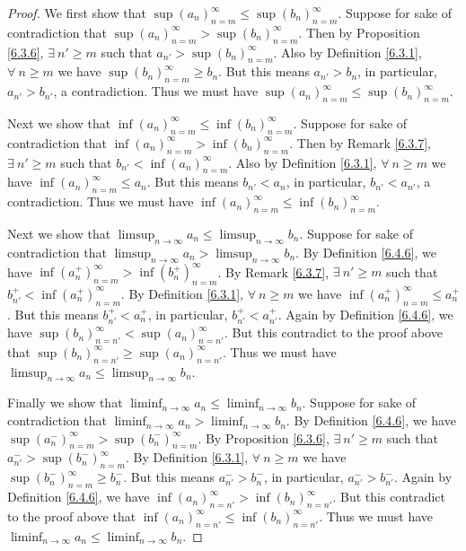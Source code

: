 \begin{proof}
    We first show that \(\sup(a_n)_{n = m}^\infty \leq \sup(b_n)_{n = m}^\infty\).
    Suppose for sake of contradiction that \(\sup(a_n)_{n = m}^\infty > \sup(b_n)_{n = m}^\infty\).
    Then by Proposition \ref{6.3.6}, \(\exists\ n' \geq m\) such that \(a_{n'} > \sup(b_n)_{n = m}^\infty\).
    Also by Definition \ref{6.3.1}, \(\forall\ n \geq m\) we have \(\sup(b_n)_{n = m}^\infty \geq b_n\).
    But this means \(a_{n'} > b_n\), in particular, \(a_{n'} > b_{n'}\), a contradiction.
    Thus we must have \(\sup(a_n)_{n = m}^\infty \leq \sup(b_n)_{n = m}^\infty\).

    Next we show that \(\inf(a_n)_{n = m}^\infty \leq \inf(b_n)_{n = m}^\infty\).
    Suppose for sake of contradiction that \(\inf(a_n)_{n = m}^\infty > \inf(b_n)_{n = m}^\infty\).
    Then by Remark \ref{6.3.7}, \(\exists\ n' \geq m\) such that \(b_{n'} < \inf(a_n)_{n = m}^\infty\).
    Also by Definition \ref{6.3.1}, \(\forall\ n \geq m\) we have \(\inf(a_n)_{n = m}^\infty \leq a_n\).
    But this means \(b_{n'} < a_n\), in particular, \(b_{n'} < a_{n'}\), a contradiction.
    Thus we must have \(\inf(a_n)_{n = m}^\infty \leq \inf(b_n)_{n = m}^\infty\).

    Next we show that \(\limsup_{n \to \infty} a_n \leq \limsup_{n \to \infty} b_n\).
    Suppose for sake of contradiction that \(\limsup_{n \to \infty} a_n > \limsup_{n \to \infty} b_n\).
    By Definition \ref{6.4.6}, we have \(\inf(a_n^+)_{n = m}^\infty > \inf(b_n^+)_{n = m}^\infty\).
    By Remark \ref{6.3.7}, \(\exists\ n' \geq m\) such that \(b_{n'}^+ < \inf(a_n^+)_{n = m}^\infty\).
    By Definition \ref{6.3.1}, \(\forall\ n \geq m\) we have \(\inf(a_n^+)_{n = m}^\infty \leq a_n^+\).
    But this means \(b_{n'}^+ < a_n^+\), in particular, \(b_{n'}^+ < a_{n'}^+\).
    Again by Definition \ref{6.4.6}, we have \(\sup(b_n)_{n = n'}^\infty < \sup(a_n)_{n = n'}^\infty\).
    But this contradict to the proof above that \(\sup(b_n)_{n = n'}^\infty \geq \sup(a_n)_{n = n'}^\infty\).
    Thus we must have \(\limsup_{n \to \infty} a_n \leq \limsup_{n \to \infty} b_n\).

    Finally we show that \(\liminf_{n \to \infty} a_n \leq \liminf_{n \to \infty} b_n\).
    Suppose for sake of contradiction that \(\liminf_{n \to \infty} a_n > \liminf_{n \to \infty} b_n\).
    By Definition \ref{6.4.6}, we have \(\sup(a_n^-)_{n = m}^\infty > \sup(b_n^-)_{n = m}^\infty\).
    By Proposition \ref{6.3.6}, \(\exists\ n' \geq m\) such that \(a_{n'}^- > \sup(b_n^-)_{n = m}^\infty\).
    By Definition \ref{6.3.1}, \(\forall\ n \geq m\) we have \(\sup(b_n^-)_{n = m}^\infty \geq b_n^-\).
    But this means \(a_{n'}^- > b_n^-\), in particular, \(a_{n'}^- > b_{n'}^-\).
    Again by Definition \ref{6.4.6}, we have \(\inf(a_n)_{n = n'}^\infty > \inf(b_n)_{n = n'}^\infty\).
    But this contradict to the proof above that \(\inf(a_n)_{n = n'}^\infty \leq \inf(b_n)_{n = n'}^\infty\).
    Thus we must have \(\liminf_{n \to \infty} a_n \leq \liminf_{n \to \infty} b_n\).
\end{proof}

